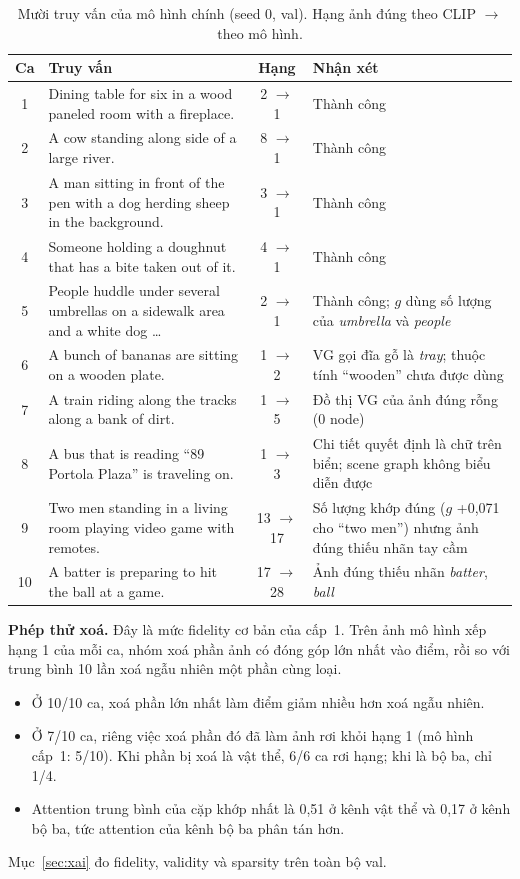 \begin{table}[t]
\centering
\caption{Mười truy vấn của mô hình chính (seed 0, val). Hạng ảnh đúng theo CLIP $\to$ theo mô hình.}
\label{tab:l1-cases}
\footnotesize
\begin{tabular}{cp{7.6cm}cp{6.0cm}}
\toprule
Ca & Truy vấn & Hạng & Nhận xét \\
\midrule
1 & Dining table for six in a wood paneled room with a fireplace. & 2 $\to$ 1 & Thành công \\
2 & A cow standing along side of a large river. & 8 $\to$ 1 & Thành công \\
3 & A man sitting in front of the pen with a dog herding sheep in the background. & 3 $\to$ 1 & Thành công \\
4 & Someone holding a doughnut that has a bite taken out of it. & 4 $\to$ 1 & Thành công \\
5 & People huddle under several umbrellas on a sidewalk area and a white dog \dots & 2 $\to$ 1 & Thành công; $g$ dùng số lượng của \emph{umbrella} và \emph{people} \\
6 & A bunch of bananas are sitting on a wooden plate. & 1 $\to$ 2 & VG gọi đĩa gỗ là \emph{tray}; thuộc tính ``wooden'' chưa được dùng \\
7 & A train riding along the tracks along a bank of dirt. & 1 $\to$ 5 & Đồ thị VG của ảnh đúng rỗng (0 node) \\
8 & A bus that is reading ``89 Portola Plaza'' is traveling on. & 1 $\to$ 3 & Chi tiết quyết định là chữ trên biển; scene graph không biểu diễn được \\
9 & Two men standing in a living room playing video game with remotes. & 13 $\to$ 17 & Số lượng khớp đúng ($g$ +0,071 cho ``two men'') nhưng ảnh đúng thiếu nhãn tay cầm \\
10 & A batter is preparing to hit the ball at a game. & 17 $\to$ 28 & Ảnh đúng thiếu nhãn \emph{batter}, \emph{ball} \\
\bottomrule
\end{tabular}
\end{table}

\textbf{Phép thử xoá.} Đây là mức fidelity cơ bản của cấp~1. Trên ảnh mô hình xếp hạng 1 của mỗi ca, nhóm xoá phần ảnh có
đóng góp lớn nhất vào điểm, rồi so với trung bình 10 lần xoá ngẫu nhiên một phần cùng loại.
\begin{itemize}
\item Ở 10/10 ca, xoá phần lớn nhất làm điểm giảm nhiều hơn xoá ngẫu nhiên.
\item Ở 7/10 ca, riêng việc xoá phần đó đã làm ảnh rơi khỏi hạng 1 (mô hình cấp~1: 5/10). Khi phần bị xoá là vật thể, 6/6 ca
rơi hạng; khi là bộ ba, chỉ 1/4.
\item Attention trung bình của cặp khớp nhất là 0,51 ở kênh vật thể và 0,17 ở kênh bộ ba, tức attention của kênh bộ ba
phân tán hơn.
\end{itemize}
Mục~\ref{sec:xai} đo fidelity, validity và sparsity trên toàn bộ val.

